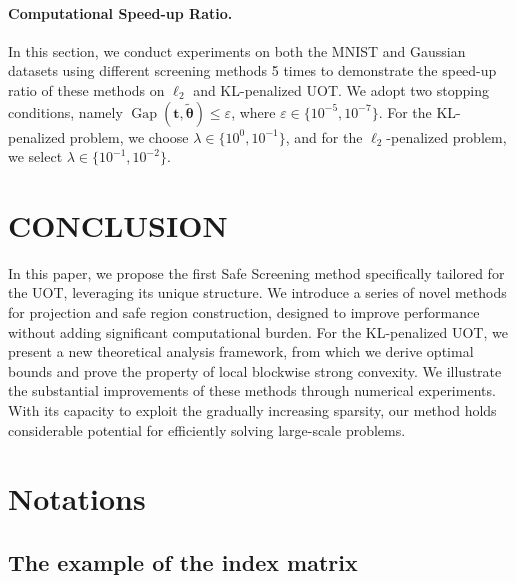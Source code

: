 \documentclass[11pt]{article}
\newcommand{\Gap}{\operatorname{Gap}}
\renewcommand{\vec}[1]{\bm{#1}}
\begin{document}
\paragraph{Computational Speed-up Ratio.}
\label{para:ex3}
In this section, we conduct experiments on both the MNIST and Gaussian datasets using different screening methods 5 times to demonstrate the speed-up ratio of these methods on $\ell_2$ and KL-penalized UOT. We adopt two stopping conditions, namely $\Gap(\vec t, \tilde{\vec{\theta}}) \leq \varepsilon$, where $\varepsilon \in \{10^{-5}, 10^{-7}\}$. For the KL-penalized problem, we choose $\lambda \in \{10^{0}, 10^{-1}\}$, and for the $\ell_2$-penalized problem, we select $\lambda \in \{10^{-1}, 10^{-2}\}$.

\section{CONCLUSION}
In this paper, we propose the first Safe Screening method specifically tailored for the UOT, leveraging its unique structure. We introduce a series of novel methods for projection and safe region construction, designed to improve performance without adding significant computational burden. For the KL-penalized UOT, we present a new theoretical analysis framework, from which we derive optimal bounds and prove the property of local blockwise strong convexity. We illustrate the substantial improvements of these methods through numerical experiments. With its capacity to exploit the gradually increasing sparsity, our method holds considerable potential for efficiently solving large-scale problems.

\clearpage


\clearpage

\appendix

\section{Notations}
\subsection{The example of the index matrix}
\end{document}

